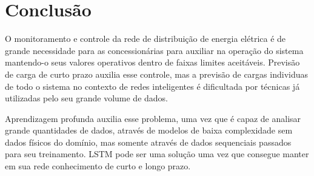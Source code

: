 \documentclass[
	12pt,				%
	oneside,			%
	a4paper,			%
	english,			%
	brazil				%
	]{abntex2}
\begin{document}
	

\chapter{Conclusão}

	O monitoramento e controle da rede de distribuição de energia elétrica é de grande necessidade para as concessionárias para auxiliar na operação do sistema mantendo-o seus valores operativos dentro de faixas limites aceitáveis.
	Previsão de carga de curto prazo auxilia esse controle, mas a previsão de cargas individuas de todo o sistema no contexto de redes inteligentes é dificultada por técnicas já utilizadas pelo seu grande volume de dados. 
	
	Aprendizagem profunda auxilia esse problema, uma vez que é capaz de analisar grande quantidades de dados, através de modelos de baixa complexidade sem dados físicos do domínio, mas somente através de dados sequenciais passados para seu treinamento. LSTM pode ser uma solução uma vez que consegue manter em sua rede conhecimento de curto e longo prazo. 
	
	
	
	
\postextual



%
%


%
%
%
%
%
\end{document}
